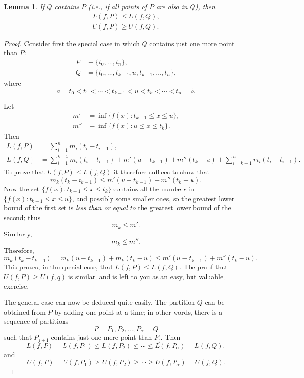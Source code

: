 \documentclass{article}
\newtheorem{lemma}{Lemma}
\begin{document}
\begin{lemma}
  If $Q$ contains $P$ (i.e., if all points of $P$ are also in $Q$), then
  \begin{align*}
    L(f, P) \leq L(f, Q), \\
    U(f, P) \geq U(f, Q).
  \end{align*}
\end{lemma}
\begin{proof}
  Consider first the special case in which $Q$ contains just one more point
  than $P$:
  \begin{align*}
    P &= \{t_0, \ldots, t_n\}, \\
    Q &= \{t_0, \ldots, t_{k - 1}, u, t_{k + 1}, \ldots, t_n\},
  \end{align*} where \[
    a = t_0 < t_1 < \cdots < t_{k - 1} < u < t_k < \cdots < t_n = b.
  \]

  Let
  \begin{align*}
    m'  &= \inf\{f(x): t_{k - 1} \leq x \leq u\}, \\
    m'' &= \inf\{f(x): u \leq x \leq t_k\}.
  \end{align*}
  Then
  \begin{align*}
    L(f, P) &= \sum_{i=1}^n m_i(t_i - t_{i-1}), \\
    L(f, Q) &= \sum_{i=1}^{k-1} m_i(t_i - t_{i-1}) + m'(u - t_{k-1}) +
    m''(t_k - u) + \sum_{i=k+1}^n m_i(t_i - t_{i-1}).
  \end{align*} To prove that $L(f, P) \leq L(f, Q)$ it therefore suffices to
  show that \[
    m_k(t_k - t_{k-1}) \leq m'(u - t_{k-1}) + m''(t_k - u).
  \] Now the set $\{f(x): t_{k-1} \leq x \leq t_k\}$ contains all the numbers
  in $\{f(x): t_{k-1} \leq x \leq u\}$, and possibly some smaller ones, so the
  greatest lower bound of the first set is \emph{less than or equal to} the
  greatest lower bound of the second; thus \[
    m_k \leq m'.
  \] Similarly, \[
    m_k \leq m''.
  \] Therefore, \[
    m_k(t_k - t_{k-1}) = m_k(u - t_{k-1}) + m_k(t_k - u) \leq m'(u - t_{k-1}) +
    m''(t_k - u).
  \] This proves, in the special case, that $L(f, P) \leq L(f, Q)$. The proof
  that $U(f, P) \geq U(f, q)$ is similar, and is left to you as an easy, but
  valuable, exercise.

  The general case can now be deduced quite easily. The partition $Q$ can be
  obtained from $P$ by adding one point at a time; in other words, there is a
  sequence of partitions \[
    P = P_1, P_2, \ldots, P_{\alpha} = Q
    \] such that $P_{j + 1}$ contains just one more point than $P_j$. Then \[
    L(f, P) = L(f, P_1) \leq L(f, P_2) \leq \cdots \leq L(f, P_{\alpha}) = L(f,
      Q),
  \] and \[
    U(f, P) = U(f, P_1) \geq U(f, P_2) \geq \cdots \geq U(f, P_{\alpha})
    = U(f, Q).
  \]
\end{proof}
\end{document}
